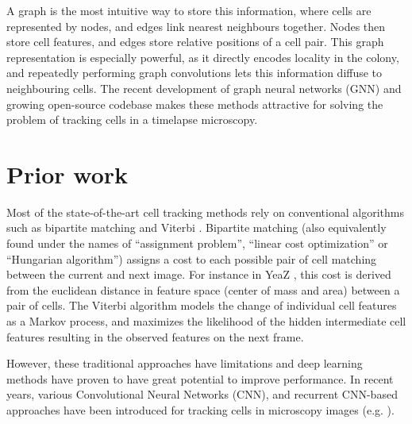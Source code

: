 \documentclass[10pt,conference,compsocconf,a4paper]{IEEEtran}
\begin{document}

	A graph is the most intuitive way to store this information, where cells are represented by nodes, and edges link nearest neighbours together. Nodes then store cell features, and edges store relative positions of a cell pair. This graph representation is especially powerful, as it directly encodes locality in the colony, and repeatedly performing graph convolutions lets this information diffuse to neighbouring cells.
	The recent development of graph neural networks (GNN) \cite{zhou_graph_2021} and growing open-source codebase \cite{paszke_pytorch_2019, fey_fast_2019} makes these methods attractive for solving the problem of tracking cells in a timelapse microscopy.

\section{Prior work}
	
	Most of the state-of-the-art cell tracking methods rely on conventional algorithms such as bipartite matching \cite{bipartite, dietler_convolutional_2020} and Viterbi \cite{viterbi, viterbi2}. Bipartite matching (also equivalently found under the names of ``assignment problem'', ``linear cost optimization'' or ``Hungarian algorithm'') assigns a cost to each possible pair of cell matching between the current and next image. For instance in YeaZ \cite{dietler_convolutional_2020}, this cost is derived from the euclidean distance in feature space (center of mass and area) between a pair of cells. The Viterbi algorithm models the change of individual cell features as a Markov process, and maximizes the likelihood of the hidden intermediate cell features resulting in the observed features on the next frame.
	
	However, these traditional approaches have limitations and deep learning methods have proven to have great potential to improve performance. In recent years, various Convolutional Neural Networks (CNN), and recurrent CNN-based approaches have been introduced for tracking cells in microscopy images (e.g. \cite{he,delta,payer,hayashida,moen}).
\end{document}

